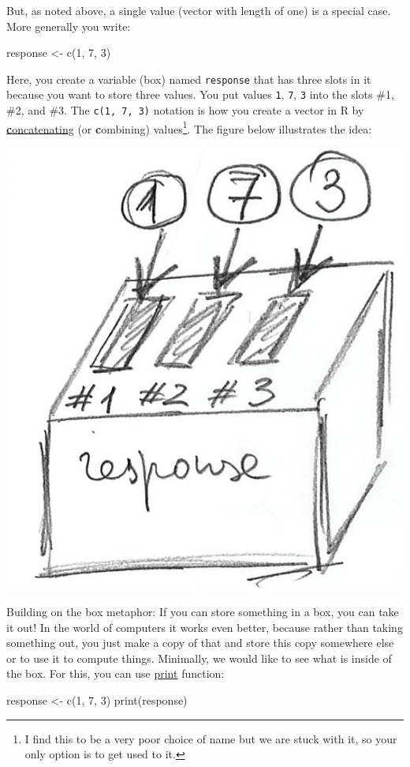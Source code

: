 \documentclass[
]{book}
\newenvironment{Shaded}{\begin{snugshade}}{\end{snugshade}}
\newcommand{\DecValTok}[1]{\textcolor[rgb]{0.00,0.00,0.81}{#1}}
\newcommand{\FunctionTok}[1]{\textcolor[rgb]{0.00,0.00,0.00}{#1}}
\newcommand{\NormalTok}[1]{#1}
\newcommand{\OtherTok}[1]{\textcolor[rgb]{0.56,0.35,0.01}{#1}}
\begin{document}
But, as noted above, a single value (vector with length of one) is a special case. More generally you write:

\begin{Shaded}
\begin{Highlighting}[]
\NormalTok{response }\OtherTok{\textless{}{-}} \FunctionTok{c}\NormalTok{(}\DecValTok{1}\NormalTok{, }\DecValTok{7}\NormalTok{, }\DecValTok{3}\NormalTok{)}
\end{Highlighting}
\end{Shaded}

Here, you create a variable (box) named \texttt{response} that has three slots in it because you want to store three values. You put values \texttt{1}, \texttt{7}, \texttt{3} into the slots \#1, \#2, and \#3. The \texttt{c(1,\ 7,\ 3)} notation is how you create a vector in R by \href{https://www.rdocumentation.org/packages/base/versions/3.6.2/topics/c}{\textbf{c}oncatenating} (or \textbf{c}ombining) values\footnote{I find this to be a very poor choice of name but we are stuck with it, so your only option is to get used to it.}. The figure below illustrates the idea:

\begin{center}\includegraphics[width=0.3\linewidth]{images/box-3-slots} \end{center}

Building on the box metaphor: If you can store something in a box, you can take it out! In the world of computers it works even better, because rather than taking something out, you just make a copy of that and store this copy somewhere else or to use it to compute things. Minimally, we would like to see what is inside of the box. For this, you can use \href{https://stat.ethz.ch/R-manual/R-devel/library/base/html/print.html}{print} function:

\begin{Shaded}
\begin{Highlighting}[]
\NormalTok{response }\OtherTok{\textless{}{-}} \FunctionTok{c}\NormalTok{(}\DecValTok{1}\NormalTok{, }\DecValTok{7}\NormalTok{, }\DecValTok{3}\NormalTok{)}
\FunctionTok{print}\NormalTok{(response)}
\end{Highlighting}
\end{Shaded}
\end{document}
